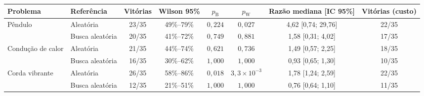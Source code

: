 \begin{tabular}{ll cc cc c c}
\toprule
Problema & Referência & Vitórias & Wilson 95\% & $p_{\mathrm{B}}$ & $p_{\mathrm{W}}$ & Razão mediana [IC 95\%] & Vitórias (custo) \\
\midrule
Pêndulo & Aleatória & 23/35 & 49\%--79\% & $0{,}224$ & $0{,}027$ & 4,62 [0,74; 29,76] & 22/35 \\
 & Busca aleatória & 20/35 & 41\%--72\% & $0{,}749$ & $0{,}881$ & 1,58 [0,31; 4,02] & 17/35 \\
\addlinespace
Condução de calor & Aleatória & 21/35 & 44\%--74\% & $0{,}621$ & $0{,}736$ & 1,49 [0,57; 2,25] & 18/35 \\
 & Busca aleatória & 16/35 & 30\%--62\% & $1{,}000$ & $1{,}000$ & 0,93 [0,65; 1,30] & 10/35 \\
\addlinespace
Corda vibrante & Aleatória & 26/35 & 58\%--86\% & $0{,}018$ & $3{,}3 \times 10^{-3}$ & 1,78 [1,24; 2,59] & 22/35 \\
 & Busca aleatória & 12/35 & 21\%--51\% & $1{,}000$ & $1{,}000$ & 0,76 [0,64; 1,10] & 11/35 \\
\bottomrule
\end{tabular}
